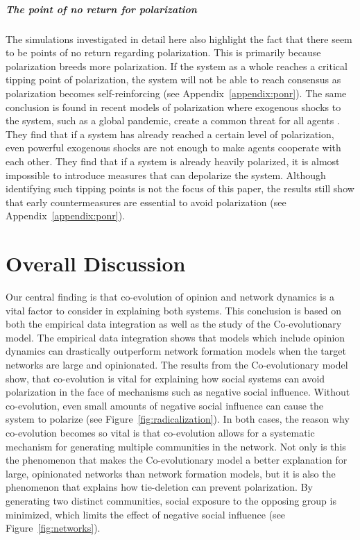 \documentclass[11pt]{article}
\begin{document}
\subsubsection{The point of no return for polarization}
The simulations investigated in detail here also highlight the fact that there seem to be points of no return regarding polarization. This is primarily because polarization breeds more polarization. If the system as a whole reaches a critical tipping point of polarization, the system will not be able to reach consensus as polarization becomes self-reinforcing (see Appendix~\ref{appendix:ponr}). The same conclusion is found in recent models of polarization where exogenous shocks to the system, such as a global pandemic, create a common threat for all agents \cite{macy2021polarization, levin_dynamics_2021}. They find that if a system has already reached a certain level of polarization, even powerful exogenous shocks are not enough to make agents cooperate with each other. They find that if a system is already heavily polarized, it is almost impossible to introduce measures that can depolarize the system. Although identifying such tipping points is not the focus of this paper, the results still show that early countermeasures are essential to avoid polarization (see Appendix~\ref{appendix:ponr}).

\part{Overall Discussion}
Our central finding is that co-evolution of opinion and network dynamics is a vital factor to consider in explaining both systems. This conclusion is based on both the empirical data integration as well as the study of the Co-evolutionary model. The empirical data integration shows that models which include opinion dynamics can drastically outperform network formation models when the target networks are large and opinionated. The results from the Co-evolutionary model show, that co-evolution is vital for explaining how social systems can avoid polarization in the face of mechanisms such as negative social influence. Without co-evolution, even small amounts of negative social influence can cause the system to polarize (see Figure~\ref{fig:radicalization}). 
In both cases, the reason why co-evolution becomes so vital is that co-evolution allows for a systematic mechanism for generating multiple communities in the network. Not only is this the phenomenon that makes the Co-evolutionary model a better explanation for large, opinionated networks than network formation models, but it is also the phenomenon that explains how tie-deletion can prevent polarization. By generating two distinct communities, social exposure to the opposing group is minimized, which limits the effect of negative social influence (see Figure~\ref{fig:networks}).
\end{document}
